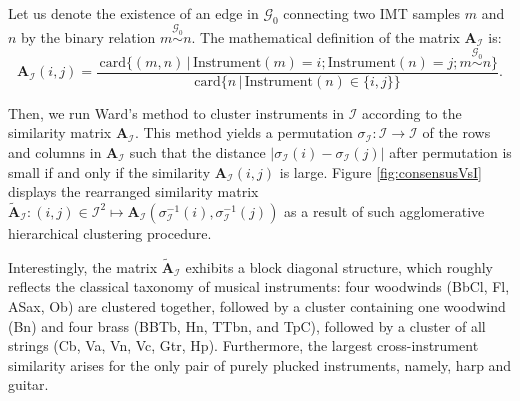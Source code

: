 \documentclass{bmcart}
\newcommand{\Card}{\mathrm{card}}
\newcommand{\ja}[1]{\textcolor{purple}{JA: #1}\xspace}
\begin{document}
Let us denote the existence of an edge in $\mathcal{G}_0$ connecting two IMT samples $m$ and $n$ by the binary relation $m \overset{\mathcal{G}_0}{\sim} n$.
The mathematical definition of the matrix $\mathbf{A}_{\mathcal{I}}$ is:
\begin{equation}
\mathbf{A}_{\mathcal{I}}(i,j) = \dfrac{
\,\Card \big\{ (m, n) \,\vert\, \mathrm{Instrument}(m)=i ; \mathrm{Instrument}(n)=j ; m \overset{\mathcal{G}_0}{\sim} n \big\}
}{
\Card \big\{n \,\vert\, \mathrm{Instrument}(n) \in \{ i, j \} \big\}
}.
\label{eq:instrument-similarity}
\end{equation}

Then, we run Ward's method \cite{ward1963jasa} to cluster instruments in $\mathcal{I}$ according to the similarity matrix $\mathbf{A}_{\mathcal{I}}$.
This method yields a permutation $\sigma_{\mathcal{I}}: \mathcal{I} \rightarrow \mathcal{I}$ of the rows and columns in $\mathbf{A}_{\mathcal{I}}$ such that the distance $\vert \sigma_{\mathcal{I}}(i) - \sigma_{\mathcal{I}}(j) \vert$ after permutation is small if and only if the similarity $\mathbf{A}_{\mathcal{I}}(i, j)$ is large.
Figure \ref{fig:consensusVsI} displays the rearranged similarity matrix $\widetilde{\mathbf{A}}_{\mathcal{I}} : (i,j)\in \mathcal{I}^2 \mapsto \mathbf{A}_{\mathcal{I}}(\sigma_{\mathcal{I}}^{-1}(i), \sigma_{\mathcal{I}}^{-1}(j))$ as a result of such agglomerative hierarchical clustering procedure. %

Interestingly, the matrix $\widetilde{\mathbf{A}}_{\mathcal{I}}$ exhibits a block diagonal structure, which roughly reflects the classical taxonomy of musical instruments: four woodwinds (BbCl, Fl, ASax, Ob) are clustered together, followed by a cluster containing one woodwind (Bn) and four brass (BBTb, Hn, TTbn, and TpC), followed by a cluster of all strings (Cb, Va, Vn, Vc, Gtr, Hp).
Furthermore, the largest cross-instrument similarity arises for the only pair of purely plucked instruments, namely, harp and guitar.
\end{document}
